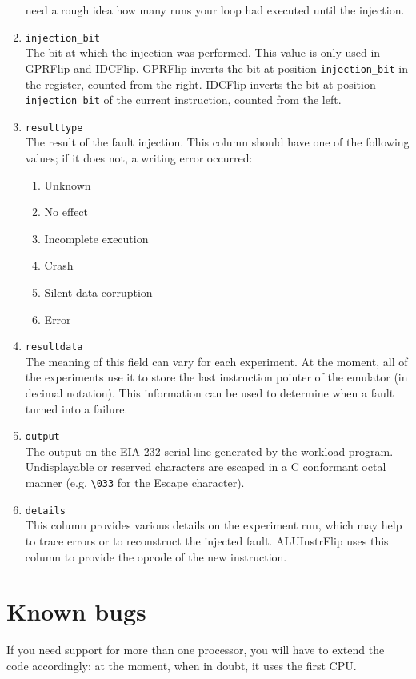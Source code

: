 \documentclass[a4paper,times,9pt]{article}
\begin{document}
\begin{enumerate}[topsep=0em,itemsep=0em]
       need a rough idea how many runs your loop had executed until
       the injection.
 \item \verb+injection_bit+\\
       The bit at which the injection was performed. This value is
       only used in GPRFlip and IDCFlip. GPRFlip inverts the bit at
       position \verb+injection_bit+ in the register, counted from the right.
       IDCFlip inverts the bit at position \verb+injection_bit+
       of the current instruction, counted from the left.    
 \item \verb+resulttype+\\
       The result of the fault injection.
       This column should have one of the following values;
       if it does not, a writing error occurred:
       \begin{enumerate}[itemsep=0em]
        \item Unknown
        \item No effect
        \item Incomplete execution
        \item Crash
        \item Silent data corruption
        \item Error
       \end{enumerate}
 \item \verb+resultdata+\\
       The meaning of this field can vary for each experiment. At the moment,
       all of the experiments use it to store the last instruction
       pointer of the emulator (in decimal notation).
       This information can be used to determine when a fault
       turned into a failure.
 \item \verb+output+\\
       The output on the EIA-232 serial line generated by the workload
       program. Undisplayable or reserved characters are escaped in a
       C conformant octal manner (e.g. \verb+\033+ for the Escape character).
 \item \verb+details+\\
       This column provides various details on the experiment run,
       which may help to
       trace errors or to reconstruct the injected fault.
       ALUInstrFlip uses this column to
       provide the opcode of the new instruction.
\end{enumerate}

\fi
\section{Known bugs}

If you need support for more than one processor,
you will have to extend the code accordingly:
at the moment, when in doubt, it uses the first CPU.
\end{document}
